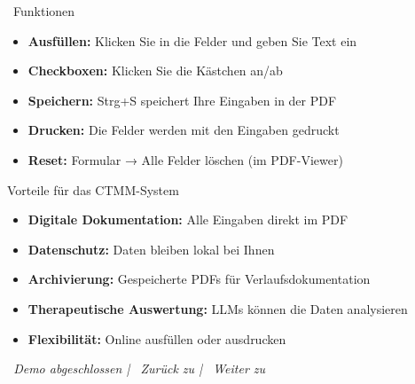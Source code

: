 \vspace{1cm}

\begin{ctmmYellowBox}{\faInfoCircle~Funktionen}
\begin{itemize}
    \item \textbf{Ausfüllen:} Klicken Sie in die Felder und geben Sie Text ein
    \item \textbf{Checkboxen:} Klicken Sie die Kästchen an/ab
    \item \textbf{Speichern:} Strg+S speichert Ihre Eingaben in der PDF
    \item \textbf{Drucken:} Die Felder werden mit den Eingaben gedruckt
    \item \textbf{Reset:} Formular → Alle Felder löschen (im PDF-Viewer)
\end{itemize}
\end{ctmmYellowBox}

\vspace{1cm}

\begin{ctmmGreenBox}{Vorteile für das CTMM-System}
\begin{itemize}
    \item \textbf{Digitale Dokumentation:} Alle Eingaben direkt im PDF
    \item \textbf{Datenschutz:} Daten bleiben lokal bei Ihnen
    \item \textbf{Archivierung:} Gespeicherte PDFs für Verlaufsdokumentation
    \item \textbf{Therapeutische Auswertung:} LLMs können die Daten analysieren
    \item \textbf{Flexibilität:} Online ausfüllen oder ausdrucken
\end{itemize}
\end{ctmmGreenBox}

\vspace{1cm}
\begin{center}
\textit{\textcolor{ctmmGreen}{\faCheckCircle~Demo abgeschlossen} | \textcolor{ctmmBlue}{\faHome~Zurück zu}  | \textcolor{ctmmPurple}{\faChartLine~Weiter zu} }
\end{center}
